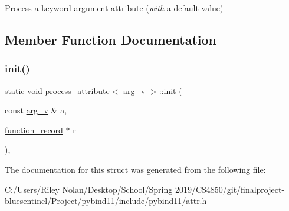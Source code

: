 Process a keyword argument attribute ({\itshape with} a default value) 

\subsection{Member Function Documentation}
\mbox{\label{structprocess__attribute_3_01arg__v_01_4_a80cd5f1ca1ee8c3e28ed0a1836bdaab6}} 
\subsubsection{\texorpdfstring{init()}{init()}}
{\footnotesize\ttfamily static \mbox{\hyperlink{_s_d_l__opengles2__gl2ext_8h_ae5d8fa23ad07c48bb609509eae494c95}{void}} \mbox{\hyperlink{structprocess__attribute}{process\+\_\+attribute}}$<$ \mbox{\hyperlink{structarg__v}{arg\+\_\+v}} $>$\+::init (\begin{DoxyParamCaption}\item[{const \mbox{\hyperlink{structarg__v}{arg\+\_\+v}} \&}]{a,  }\item[{\mbox{\hyperlink{structfunction__record}{function\+\_\+record}} $\ast$}]{r }\end{DoxyParamCaption})\hspace{0.3cm}{\ttfamily [inline]}, {\ttfamily [static]}}



The documentation for this struct was generated from the following file\+:\begin{DoxyCompactItemize}
\item 
C\+:/\+Users/\+Riley Nolan/\+Desktop/\+School/\+Spring 2019/\+C\+S4850/git/finalproject-\/bluesentinel/\+Project/pybind11/include/pybind11/\mbox{\hyperlink{attr_8h}{attr.\+h}}\end{DoxyCompactItemize}
